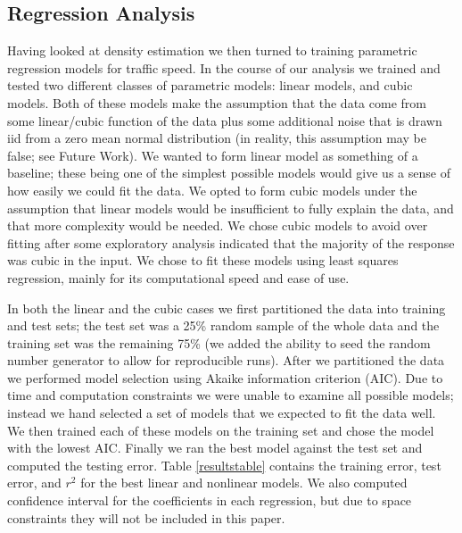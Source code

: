 \documentclass[12pt]{article}
\begin{document}
\subsection{Regression Analysis}
Having looked at density estimation we then turned to training parametric regression models for traffic speed.
In the course of our analysis we trained and tested two different classes of parametric models: linear models, and cubic models. Both of these models make the assumption that the data come from some linear/cubic function of the data plus some additional noise that is drawn iid from a zero mean normal distribution (in reality, this assumption may be false; see Future Work). We wanted to form linear model as something of a baseline; these being one of the  simplest possible models would give us a sense of how easily we could fit the data. We opted to form cubic models under the assumption that linear models would be insufficient to fully explain the data, and that more complexity would be needed. We chose cubic models to avoid over fitting after some exploratory analysis indicated that the majority of the response was cubic in the input. We chose to fit these models using least squares regression, mainly for its computational speed and ease of use.

In both the linear and the cubic cases we first partitioned the data into training and test sets; the test set was a 25\% random sample of the whole data and the training set was the remaining 75\% (we added the ability to seed the random number generator to allow for reproducible runs). After we partitioned the data we performed model selection using Akaike information criterion (AIC). Due to time and computation constraints we were unable to examine all possible models; instead we hand selected a set of models that we expected to fit the data well. We then trained each of these models on the training set and chose the model with the lowest AIC. Finally we ran the best model against the test set and computed the testing error. Table \ref{resultstable} contains the training error, test error, and $r^2$ for the best linear and nonlinear models. We also computed confidence interval for the coefficients in each regression, but due to space constraints they will not be included in this paper.
\end{document}
